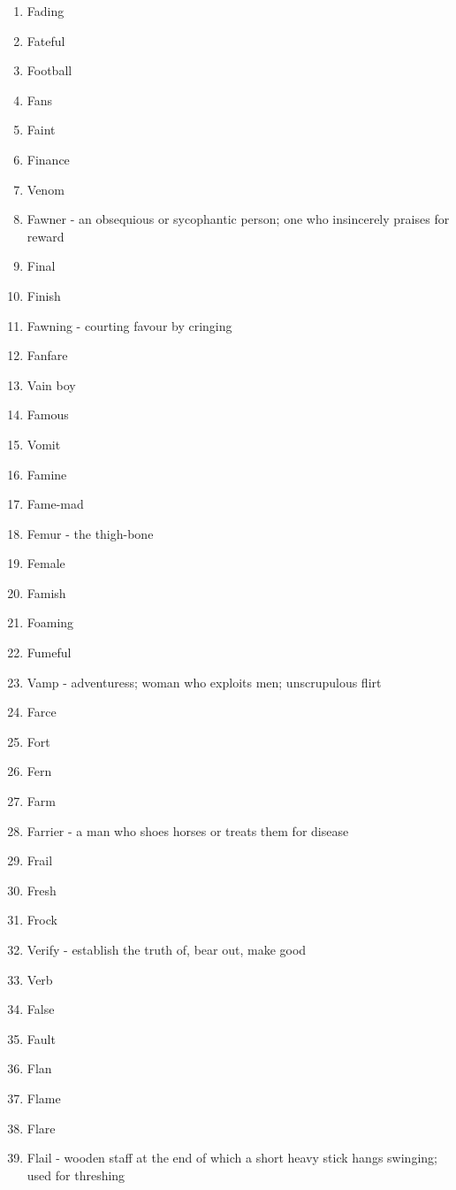\begin{enumerate}
        \item Fading
        \item Fateful
        \item Football
        \item Fans
        \item Faint
        \item Finance
        \item Venom
        \item Fawner - an obsequious or sycophantic person; one who insincerely praises for reward
        \item Final
        \item Finish
        \item Fawning - courting favour by cringing
        \item Fanfare
        \item Vain boy
        \item Famous
        \item Vomit
        \item Famine
        \item Fame-mad
        \item Femur - the thigh-bone
        \item Female
        \item Famish
        \item Foaming
        \item Fumeful
        \item Vamp - adventuress; woman who exploits men; unscrupulous flirt
        \item Farce
        \item Fort
        \item Fern
        \item Farm
        \item Farrier - a man who shoes horses or treats them for disease
        \item Frail
        \item Fresh
        \item Frock
        \item Verify - establish the truth of, bear out, make good
        \item Verb
        \item False
        \item Fault
        \item Flan
        \item Flame
        \item Flare
        \item Flail - wooden staff at the end of which a short heavy stick hangs swinging; used for threshing

\end{enumerate}
